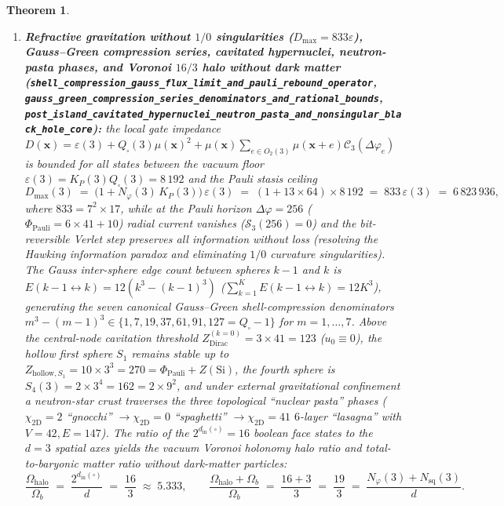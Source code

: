 \documentclass[11pt,a4paper]{article}
\theoremstyle{plain}
\newtheorem{theorem}{Theorem}[section]
\theoremstyle{definition}
\begin{document}
\begin{theorem}
\begin{enumerate}[label=\textbf{(\arabic*)},leftmargin=*]
\item \textbf{Refractive gravitation without $1/0$ singularities ($D_{\max} = 833\varepsilon$), Gauss--Green compression series, cavitated hypernuclei, neutron-pasta phases, and Voronoi $16/3$ halo without dark matter (\texttt{shell\_compression\_gauss\_flux\_limit\_and\_pauli\_rebound\_operator}, \texttt{gauss\_green\_compression\_series\_denominators\_and\_rational\_bounds}, \texttt{post\_island\_cavitated\_hypernuclei\_neutron\_pasta\_and\_nonsingular\_black\_hole\_core}):}
  the local gate impedance $D(\mathbf{x}) = \varepsilon(3) + Q_\square(3)\mu(\mathbf{x})^2 + \mu(\mathbf{x})\sum_{e\in O_2(3)}\mu(\mathbf{x}+e)\mathcal{C}_3(\Delta\varphi_e)$ is bounded for all states between the vacuum floor $\varepsilon(3) = K_P(3) Q_\square(3) = 8\,192$ and the Pauli stasis ceiling
  \begin{equation}
    \label{eq:pauli-stasis-ceiling-833}
    D_{\max}(3) \;=\; \bigl(1 + N_\varphi(3)\,K_P(3)\bigr)\,\varepsilon(3) \;=\; (1 + 13\times 64)\times 8\,192 \;=\; 833\,\varepsilon(3) \;=\; 6\,823\,936,
  \end{equation}
  where $833 = 7^2\times 17$, while at the Pauli horizon $\Delta\varphi = 256$ ($\Phi_{\mathrm{Pauli}} = 6\times 41 + 10$) radial current vanishes ($\mathcal{S}_3(256) = 0$) and the bit-reversible Verlet step preserves all information without loss (resolving the Hawking information paradox and eliminating $1/0$ curvature singularities). The Gauss inter-sphere edge count between spheres $k-1$ and $k$ is $E(k-1\leftrightarrow k) = 12(k^3 - (k-1)^3)$ ($\sum_{k=1}^K E(k-1\leftrightarrow k) = 12 K^3$), generating the seven canonical Gauss--Green shell-compression denominators $m^3 - (m-1)^3 \in \{1, 7, 19, 37, 61, 91, 127 = Q_\square - 1\}$ for $m = 1,\dots,7$. Above the central-node cavitation threshold $Z_{\mathrm{Dirac}}^{(k=0)} = 3\times 41 = 123$ ($u_0 \equiv 0$), the hollow first sphere $S_1$ remains stable up to $Z_{\mathrm{hollow},S_1} = 10\times 3^3 = 270 = \Phi_{\mathrm{Pauli}} + Z(\mathrm{Si})$, the fourth sphere is $S_4(3) = 2\times 3^4 = 162 = 2\times 9^2$, and under external gravitational confinement a neutron-star crust traverses the three topological ``nuclear pasta'' phases ($\chi_{\mathrm{2D}} = 2$ ``gnocchi'' $\to \chi_{\mathrm{2D}} = 0$ ``spaghetti'' $\to \chi_{\mathrm{2D}} = 41$ $6$-layer ``lasagna'' with $V = 42, E = 147$). The ratio of the $2^{d_{\mathrm{in}}(\square)} = 16$ boolean face states to the $d = 3$ spatial axes yields the vacuum Voronoi holonomy halo ratio and total-to-baryonic matter ratio without dark-matter particles:
  \begin{equation}
    \label{eq:voronoi-halo-16-3}
    \frac{\Omega_{\mathrm{halo}}}{\Omega_b} \;=\; \frac{2^{d_{\mathrm{in}}(\square)}}{d} \;=\; \frac{16}{3} \;\approx\; 5.333, \qquad
    \frac{\Omega_{\mathrm{halo}} + \Omega_b}{\Omega_b} \;=\; \frac{16 + 3}{3} \;=\; \frac{19}{3} \;=\; \frac{N_\varphi(3) + N_{\mathrm{sq}}(3)}{d}.
  \end{equation}


\end{enumerate}
\end{theorem}
\end{document}
